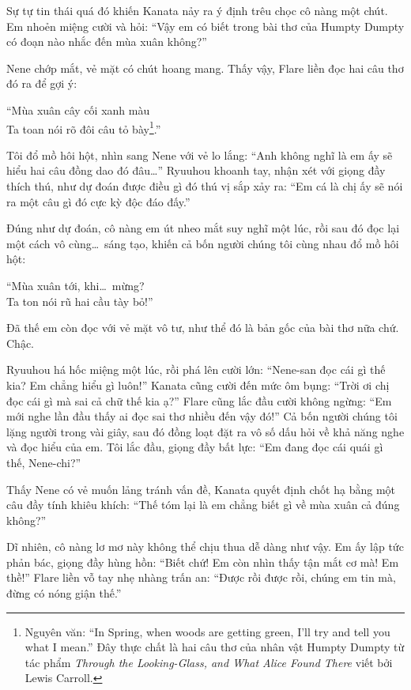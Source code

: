 \documentclass[../main.tex]{subfiles}
\begin{document}
Sự tự tin thái quá đó khiến Kanata nảy ra ý định trêu chọc cô nàng một chút. Em nhoẻn miệng cười và hỏi: ``Vậy em có biết trong bài thơ của Humpty Dumpty có đoạn nào nhắc đến mùa xuân không?''

Nene chớp mắt, vẻ mặt có chút hoang mang. Thấy vậy, Flare liền đọc hai câu thơ đó ra để gợi ý:

\begin{center}
  ``Mùa xuân cây cối xanh màu\\
  Ta toan nói rõ đôi câu tỏ bày\footnote{Nguyên văn: ``In Spring, when woods are getting green, I'll try and tell you what I mean.'' Đây thực chất là hai câu thơ của nhân vật Humpty Dumpty từ tác phẩm \textit{Through the Looking-Glass, and What Alice Found There} viết bởi Lewis Carroll.}.''
\end{center}

Tôi đổ mồ hôi hột, nhìn sang Nene với vẻ lo lắng: ``Anh không nghĩ là em ấy sẽ hiểu hai câu đồng dao đó đâu\dots'' Ryuuhou khoanh tay, nhận xét với giọng đầy thích thú, như dự đoán được điều gì đó thú vị sắp xảy ra: ``Em cá là chị ấy sẽ nói ra một câu gì đó cực kỳ độc đáo đấy.''

Đúng như dự đoán, cô nàng em út nheo mắt suy nghĩ một lúc, rồi sau đó đọc lại một cách vô cùng\dots\ sáng tạo, khiến cả bốn người chúng tôi cùng nhau đổ mồ hôi hột:

\begin{center}
  ``Mùa xuân tới, khi\dots\ mừng?\\
  Ta ton nói rũ hai cầu tày bỏ!''
\end{center}

Đã thế em còn đọc với vẻ mặt vô tư, như thể đó là bản gốc của bài thơ nữa chứ. Chậc.


Ryuuhou há hốc miệng một lúc, rồi phá lên cười lớn: ``Nene-san đọc cái gì thế kia? Em chẳng hiểu gì luôn!'' Kanata cũng cười đến mức ôm bụng: ``Trời ơi chị đọc cái gì mà sai cả chữ thế kia ạ?'' Flare cũng lắc đầu cười không ngừng: ``Em mới nghe lần đầu thấy ai đọc sai thơ nhiều đến vậy đó!'' Cả bốn người chúng tôi lặng người trong vài giây, sau đó đồng loạt đặt ra vô số dấu hỏi về khả năng nghe và đọc hiểu của em. Tôi lắc đầu, giọng đầy bất lực: ``Em đang đọc cái quái gì thế, Nene-chi?''

Thấy Nene có vẻ muốn lảng tránh vấn đề, Kanata quyết định chốt hạ bằng một câu đầy tính khiêu khích: ``Thế tóm lại là em chẳng biết gì về mùa xuân cả đúng không?''

Dĩ nhiên, cô nàng lơ mơ này không thể chịu thua dễ dàng như vậy. Em ấy lập tức phản bác, giọng đầy hùng hồn: ``Biết chứ! Em còn nhìn thấy tận mắt cơ mà! Em thề!''
Flare liền vỗ tay nhẹ nhàng trấn an: ``Được rồi được rồi, chúng em tin mà, đừng có nóng giận thế.''
\end{document}
